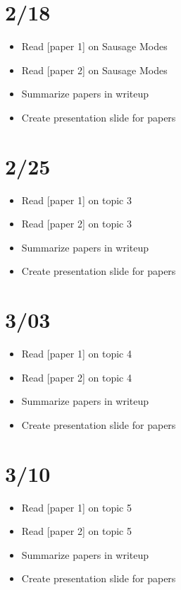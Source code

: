 \documentclass[12pt]{article}
\begin{document}
\vspace{-0.5cm}
\section*{2/18}
\vspace{-0.5cm}
\begin{itemize}
    \item Read [paper 1] on Sausage Modes
    \item Read [paper 2] on Sausage Modes
    \item Summarize papers in writeup
    \item Create presentation slide for papers
\end{itemize}

\section*{2/25}
\vspace{-0.5cm}
\begin{itemize}
    \item Read [paper 1] on topic 3
    \item Read [paper 2] on topic 3
    \item Summarize papers in writeup
    \item Create presentation slide for papers
\end{itemize}

\section*{3/03}
\vspace{-0.5cm}
\begin{itemize}
    \item Read [paper 1] on topic 4
    \item Read [paper 2] on topic 4
    \item Summarize papers in writeup
    \item Create presentation slide for papers
\end{itemize}

\section*{3/10}
\vspace{-0.5cm}
\begin{itemize}
    \item Read [paper 1] on topic 5
    \item Read [paper 2] on topic 5
    \item Summarize papers in writeup
    \item Create presentation slide for papers
\end{itemize}
\end{document}
